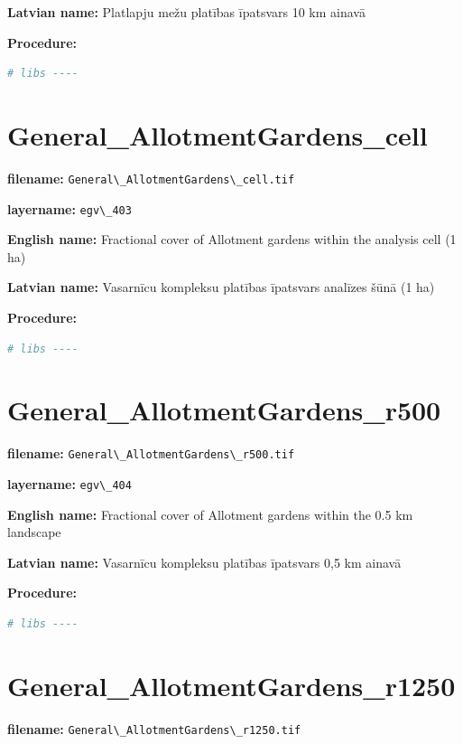 \documentclass[
]{book}
\newcommand{\passthrough}[1]{#1}
\begin{document}
\textbf{Latvian name:} Platlapju mežu platības īpatsvars 10 km ainavā

\textbf{Procedure:}

\begin{lstlisting}[language=R]
# libs ----
\end{lstlisting}

\section{General\_AllotmentGardens\_cell}\label{ch06.403}

\textbf{filename:} \passthrough{\lstinline!General\_AllotmentGardens\_cell.tif!}

\textbf{layername:} \passthrough{\lstinline!egv\_403!}

\textbf{English name:} Fractional cover of Allotment gardens within the analysis cell (1 ha)

\textbf{Latvian name:} Vasarnīcu kompleksu platības īpatsvars analīzes šūnā (1 ha)

\textbf{Procedure:}

\begin{lstlisting}[language=R]
# libs ----
\end{lstlisting}

\section{General\_AllotmentGardens\_r500}\label{ch06.404}

\textbf{filename:} \passthrough{\lstinline!General\_AllotmentGardens\_r500.tif!}

\textbf{layername:} \passthrough{\lstinline!egv\_404!}

\textbf{English name:} Fractional cover of Allotment gardens within the 0.5 km landscape

\textbf{Latvian name:} Vasarnīcu kompleksu platības īpatsvars 0,5 km ainavā

\textbf{Procedure:}

\begin{lstlisting}[language=R]
# libs ----
\end{lstlisting}

\section{General\_AllotmentGardens\_r1250}\label{ch06.405}

\textbf{filename:} \passthrough{\lstinline!General\_AllotmentGardens\_r1250.tif!}
\end{document}

